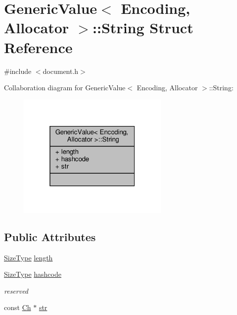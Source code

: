 \hypertarget{structGenericValue_1_1String}{}\section{Generic\+Value$<$ Encoding, Allocator $>$\+:\+:String Struct Reference}
\label{structGenericValue_1_1String}


{\ttfamily \#include $<$document.\+h$>$}



Collaboration diagram for Generic\+Value$<$ Encoding, Allocator $>$\+:\+:String\+:
\nopagebreak
\begin{figure}[H]
\begin{center}
\leavevmode
\includegraphics[width=208pt]{structGenericValue_1_1String__coll__graph}
\end{center}
\end{figure}
\subsection*{Public Attributes}
\begin{DoxyCompactItemize}
\item 
\hyperlink{rapidjson_8h_a5ed6e6e67250fadbd041127e6386dcb5}{Size\+Type} \hyperlink{structGenericValue_1_1String_ad6ffab0e093aa8db6e415812ff6443bf}{length}
\item 
\hyperlink{rapidjson_8h_a5ed6e6e67250fadbd041127e6386dcb5}{Size\+Type} \hyperlink{structGenericValue_1_1String_a73631052aeb72fbabb6eaab0175f858e}{hashcode}
\begin{DoxyCompactList}\small\item\em reserved \end{DoxyCompactList}\item 
const \hyperlink{classGenericValue_ade0e0ce64ccd5d852da57a35e720bafb}{Ch} $\ast$ \hyperlink{structGenericValue_1_1String_a4eebc5acf3f93ab833efd82abf3ba84d}{str}
\end{DoxyCompactItemize}


